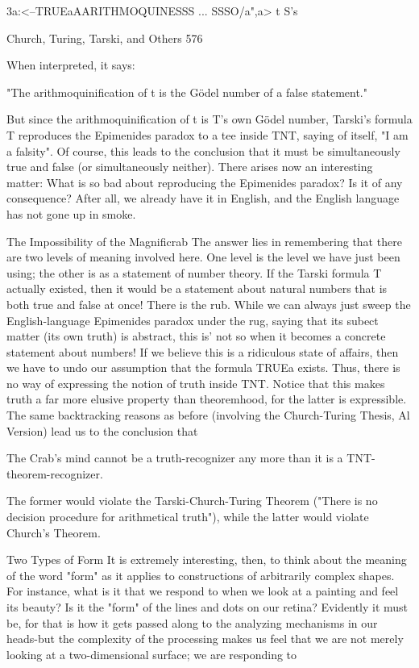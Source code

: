 {               3a:<--TRUE{a}AARITHMOQUINE{SSS ... SSSO/a",a}>
                                             t S's




Church, Turing, Tarski, and Others                                                    576

When interpreted, it says:

                             "The arithmoquinification of t is the
                             Gödel number of a false statement."

But since the arithmoquinification of t is T's own Gödel number, Tarski's formula T
reproduces the Epimenides paradox to a tee inside TNT, saying of itself, "I am a falsity".
Of course, this leads to the conclusion that it must be simultaneously true and false (or
simultaneously neither). There arises now an interesting matter: What is so bad about
reproducing the Epimenides paradox? Is it of any consequence? After all, we already
have it in English, and the English language has not gone up in smoke.

                      The Impossibility of the Magnificrab
The answer lies in remembering that there are two levels of meaning involved here. One
level is the level we have just been using; the other is as a statement of number theory. If
the Tarski formula T actually existed, then it would be a statement about natural numbers
that is both true and false at once! There is the rub. While we can always just sweep the
English-language Epimenides paradox under the rug, saying that its subect matter (its
own truth) is abstract, this is' not so when it becomes a concrete statement about
numbers! If we believe this is a ridiculous state of affairs, then we have to undo our
assumption that the formula TRUE{a} exists. Thus, there is no way of expressing the
notion of truth inside TNT. Notice that this makes truth a far more elusive property than
theoremhood, for the latter is expressible. The same backtracking reasons as before
(involving the Church-Turing Thesis, Al Version) lead us to the conclusion that

      The Crab's mind cannot be a truth-recognizer any more than it is a TNT-
      theorem-recognizer.

The former would violate the Tarski-Church-Turing Theorem ("There is no decision
procedure for arithmetical truth"), while the latter would violate Church's Theorem.

                                  Two Types of Form
It is extremely interesting, then, to think about the meaning of the word "form" as it
applies to constructions of arbitrarily complex shapes. For instance, what is it that we
respond to when we look at a painting and feel its beauty? Is it the "form" of the lines and
dots on our retina? Evidently it must be, for that is how it gets passed along to the
analyzing mechanisms in our heads-but the complexity of the processing makes us feel
that we are not merely looking at a two-dimensional surface; we are responding to




}

